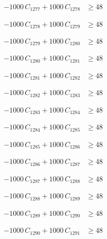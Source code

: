 \documentclass[a4paper,11pt]{article}
\begin{document}
\begin{align}
-1000\,C_{1277} + 1000\,C_{1278} &\geq 48 \nonumber
\end{align}

\begin{align}
-1000\,C_{1278} + 1000\,C_{1279} &\geq 48 \nonumber
\end{align}

\begin{align}
-1000\,C_{1279} + 1000\,C_{1280} &\geq 48 \nonumber
\end{align}

\begin{align}
-1000\,C_{1280} + 1000\,C_{1281} &\geq 48 \nonumber
\end{align}

\begin{align}
-1000\,C_{1281} + 1000\,C_{1282} &\geq 48 \nonumber
\end{align}

\begin{align}
-1000\,C_{1282} + 1000\,C_{1283} &\geq 48 \nonumber
\end{align}

\begin{align}
-1000\,C_{1283} + 1000\,C_{1284} &\geq 48 \nonumber
\end{align}

\begin{align}
-1000\,C_{1284} + 1000\,C_{1285} &\geq 48 \nonumber
\end{align}

\begin{align}
-1000\,C_{1285} + 1000\,C_{1286} &\geq 48 \nonumber
\end{align}

\begin{align}
-1000\,C_{1286} + 1000\,C_{1287} &\geq 48 \nonumber
\end{align}

\begin{align}
-1000\,C_{1287} + 1000\,C_{1288} &\geq 48 \nonumber
\end{align}

\begin{align}
-1000\,C_{1288} + 1000\,C_{1289} &\geq 48 \nonumber
\end{align}

\begin{align}
-1000\,C_{1289} + 1000\,C_{1290} &\geq 48 \nonumber
\end{align}

\begin{align}
-1000\,C_{1290} + 1000\,C_{1291} &\geq 48 \nonumber
\end{align}
\end{document}

